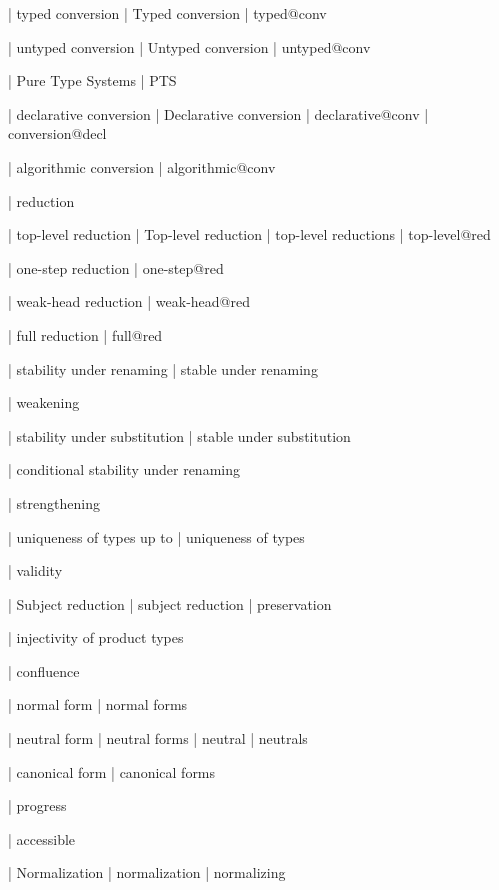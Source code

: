   | typed conversion
  | Typed conversion
  | typed@conv

  | untyped conversion
  | Untyped conversion
  | untyped@conv

  | Pure Type Systems
  | PTS

  | declarative conversion
  | Declarative conversion
  | declarative@conv
  | conversion@decl

  | algorithmic conversion
  | algorithmic@conv

  | reduction

  | top-level reduction
  | Top-level reduction
  | top-level reductions
  | top-level@red

  | one-step reduction
  | one-step@red

  | weak-head reduction
  | weak-head@red

  | full reduction
  | full@red

  | stability under renaming
  | stable under renaming

  | weakening

  | stability under substitution
  | stable under substitution

  | conditional stability under renaming

  | strengthening

  | uniqueness of types up to
  | uniqueness of types

  | validity

  | Subject reduction
  | subject reduction
  | preservation

  | injectivity of product types

  | confluence

  | normal form
  | normal forms

  | neutral form
  | neutral forms
  | neutral
  | neutrals

  | canonical form
  | canonical forms

  | progress

  | accessible

  | Normalization
  | normalization
  | normalizing

